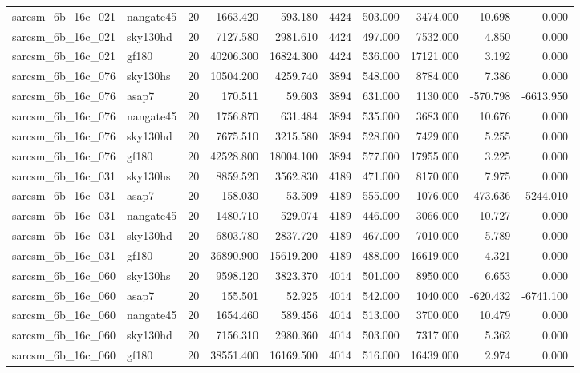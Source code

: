 \begin{longtable}{llrrrrrrrr}
sarcsm\_6b\_16c\_021 & nangate45 & 20 & 1663.420 & 593.180 & 4424 & 503.000 & 3474.000 & 10.698 & 0.000 \\
sarcsm\_6b\_16c\_021 & sky130hd & 20 & 7127.580 & 2981.610 & 4424 & 497.000 & 7532.000 & 4.850 & 0.000 \\
sarcsm\_6b\_16c\_021 & gf180 & 20 & 40206.300 & 16824.300 & 4424 & 536.000 & 17121.000 & 3.192 & 0.000 \\
sarcsm\_6b\_16c\_076 & sky130hs & 20 & 10504.200 & 4259.740 & 3894 & 548.000 & 8784.000 & 7.386 & 0.000 \\
sarcsm\_6b\_16c\_076 & asap7 & 20 & 170.511 & 59.603 & 3894 & 631.000 & 1130.000 & -570.798 & -6613.950 \\
sarcsm\_6b\_16c\_076 & nangate45 & 20 & 1756.870 & 631.484 & 3894 & 535.000 & 3683.000 & 10.676 & 0.000 \\
sarcsm\_6b\_16c\_076 & sky130hd & 20 & 7675.510 & 3215.580 & 3894 & 528.000 & 7429.000 & 5.255 & 0.000 \\
sarcsm\_6b\_16c\_076 & gf180 & 20 & 42528.800 & 18004.100 & 3894 & 577.000 & 17955.000 & 3.225 & 0.000 \\
sarcsm\_6b\_16c\_031 & sky130hs & 20 & 8859.520 & 3562.830 & 4189 & 471.000 & 8170.000 & 7.975 & 0.000 \\
sarcsm\_6b\_16c\_031 & asap7 & 20 & 158.030 & 53.509 & 4189 & 555.000 & 1076.000 & -473.636 & -5244.010 \\
sarcsm\_6b\_16c\_031 & nangate45 & 20 & 1480.710 & 529.074 & 4189 & 446.000 & 3066.000 & 10.727 & 0.000 \\
sarcsm\_6b\_16c\_031 & sky130hd & 20 & 6803.780 & 2837.720 & 4189 & 467.000 & 7010.000 & 5.789 & 0.000 \\
sarcsm\_6b\_16c\_031 & gf180 & 20 & 36890.900 & 15619.200 & 4189 & 488.000 & 16619.000 & 4.321 & 0.000 \\
sarcsm\_6b\_16c\_060 & sky130hs & 20 & 9598.120 & 3823.370 & 4014 & 501.000 & 8950.000 & 6.653 & 0.000 \\
sarcsm\_6b\_16c\_060 & asap7 & 20 & 155.501 & 52.925 & 4014 & 542.000 & 1040.000 & -620.432 & -6741.100 \\
sarcsm\_6b\_16c\_060 & nangate45 & 20 & 1654.460 & 589.456 & 4014 & 513.000 & 3700.000 & 10.479 & 0.000 \\
sarcsm\_6b\_16c\_060 & sky130hd & 20 & 7156.310 & 2980.360 & 4014 & 503.000 & 7317.000 & 5.362 & 0.000 \\
sarcsm\_6b\_16c\_060 & gf180 & 20 & 38551.400 & 16169.500 & 4014 & 516.000 & 16439.000 & 2.974 & 0.000 \\

\end{longtable}
